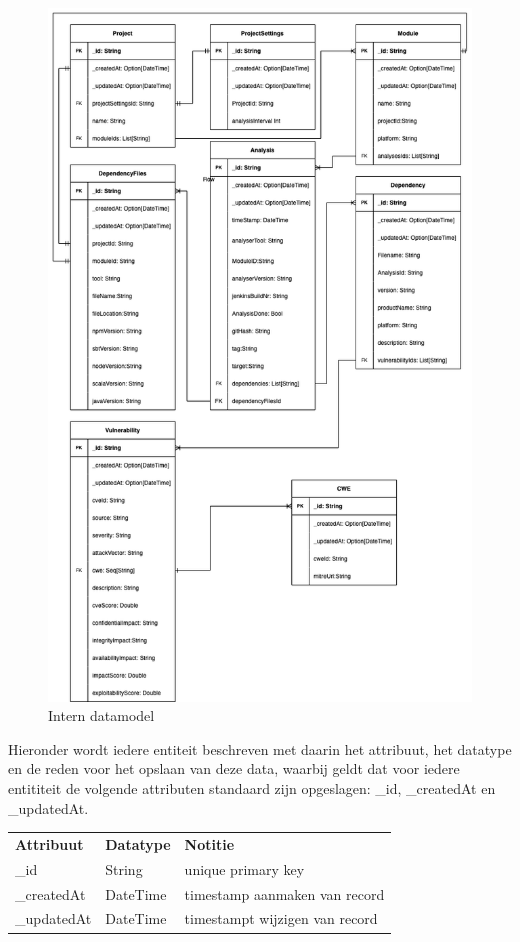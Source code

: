\begin{figure}[H]
    \myfloatalign
    \includegraphics[width=15cm]{gfx/SOUPAPI-SOUPAPI DM}
    \caption{Intern datamodel}
    \label{fig:SOUP-SoupApiDm}
\end{figure}

Hieronder wordt iedere entiteit beschreven met daarin het attribuut, het datatype en de reden voor het opslaan van deze data, waarbij geldt dat voor iedere entititeit de volgende attributen standaard zijn opgeslagen: \_id, \_createdAt en \_updatedAt.

\begin{tabular}{lll}
    \textbf{Attribuut} & \textbf{Datatype} & \textbf{Notitie}               \\
    \_id               & String            & unique primary key             \\
    \_createdAt        & DateTime          & timestamp aanmaken van record  \\
    \_updatedAt        & DateTime          & timestampt wijzigen van record \\

\end{tabular}

